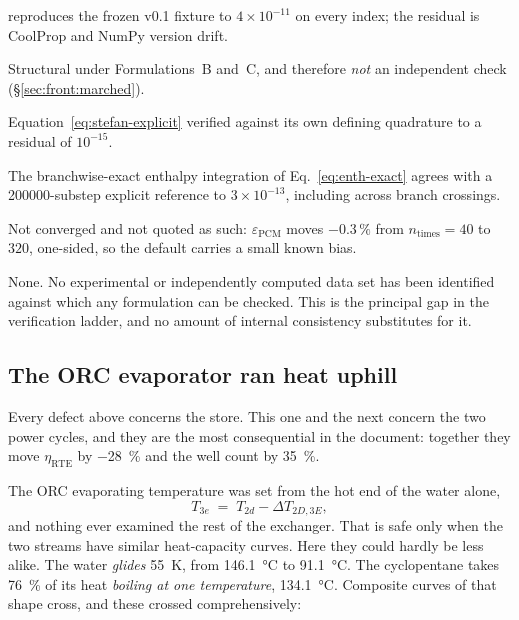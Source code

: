 \begin{description}[leftmargin=1.6em,itemsep=3pt]
\item[Regression.]  reproduces the frozen v0.1
  fixture to $4\times10^{-11}$ on every index; the residual is CoolProp and
  NumPy version drift.
\item[Energy closure.] Structural under Formulations~B and~C, and therefore
  \emph{not} an independent check (\S\ref{sec:front:marched}).
\item[Analytical.] Equation~\eqref{eq:stefan-explicit} verified against its own
  defining quadrature to a residual of $10^{-15}$.
\item[Numerical.] The branchwise-exact enthalpy integration of
  Eq.~\eqref{eq:enth-exact} agrees with a \num{200000}-substep explicit
  reference to $3\times10^{-13}$, including across branch crossings.
\item[Grid.] Not converged and not quoted as such: $\varepsilon_{\mathrm{PCM}}$
  moves $-0.3\,\%$ from $n_{\mathrm{times}}=40$ to $320$, one-sided, so the
  default carries a small known bias.
\item[External validation.] None. No experimental or independently computed data
  set has been identified against which any formulation can be checked. This
  is the principal gap in the verification ladder, and no amount of internal
  consistency substitutes for it.
\end{description}

\subsection{The ORC evaporator ran heat uphill}
\label{sec:defects:orcpinch}

Every defect above concerns the store. This one and the next concern the two
power cycles, and they are the most consequential in the document: together they
move $\eta_{\mathrm{RTE}}$ by \SI{-28}{\percent} and the well count by
\SI{+35}{\percent}.

The ORC evaporating temperature was set from the hot end of the water alone,
\begin{equation}
  T_{3e} \;=\; T_{2d} - \Delta T_{2D,3E},
  \label{eq:hot-end-rule}
\end{equation}
and nothing ever examined the rest of the exchanger. That is safe only when the
two streams have similar heat-capacity curves. Here they could hardly be less
alike. The water \emph{glides} \SI{55}{\kelvin}, from \SI{146.1}{\celsius} to
\SI{91.1}{\celsius}. The cyclopentane takes \SI{76}{\percent} of its heat
\emph{boiling at one temperature}, \SI{134.1}{\celsius}. Composite curves of
that shape cross, and these crossed comprehensively:

